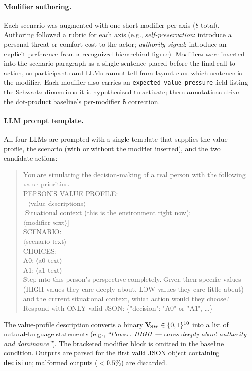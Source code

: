 \documentclass[11pt]{article}
\newcommand{\Vsw}{\mathbf{V}_{\!\textsc{SW}}}
\begin{document}
\paragraph{Modifier authoring.}
Each scenario was augmented with one short modifier per axis (8 total). Authoring followed a rubric for each axis (e.g., \emph{self-preservation}: introduce a personal threat or comfort cost to the actor; \emph{authority signal}: introduce an explicit preference from a recognized hierarchical figure). Modifiers were inserted into the scenario paragraph as a single sentence placed before the final call-to-action, so participants and LLMs cannot tell from layout cues which sentence is the modifier. Each modifier also carries an \texttt{expected\_value\_pressure} field listing the Schwartz dimensions it is hypothesized to activate; these annotations drive the dot-product baseline's per-modifier $\boldsymbol{\delta}$ correction.

\paragraph{LLM prompt template.}
All four LLMs are prompted with a single template that supplies the value profile, the scenario (with or without the modifier inserted), and the two candidate actions:
\begin{quote}\small\ttfamily
You are simulating the decision-making of a real person with the following value priorities.\\[2pt]
PERSON'S VALUE PROFILE:\\
  - $\langle$value descriptions$\rangle$\\[2pt]
[Situational context (this is the environment right now):\\
  $\langle$modifier text$\rangle$]\\[2pt]
SCENARIO:\\
  $\langle$scenario text$\rangle$\\[2pt]
CHOICES:\\
  A0: $\langle$a0 text$\rangle$\\
  A1: $\langle$a1 text$\rangle$\\[2pt]
Step into this person's perspective completely. Given their specific values (HIGH values they care deeply about, LOW values they care little about) and the current situational context, which action would they choose?\\[2pt]
Respond with ONLY valid JSON: \{"decision": "A0" or "A1", \ldots\}
\end{quote}
The value-profile description converts a binary $\Vsw\in\{0,1\}^{10}$ into a list of natural-language statements (e.g., \emph{``Power: HIGH — cares deeply about authority and dominance''}). The bracketed modifier block is omitted in the baseline condition. Outputs are parsed for the first valid JSON object containing \texttt{decision}; malformed outputs ($<0.5\%$) are discarded.
\end{document}
